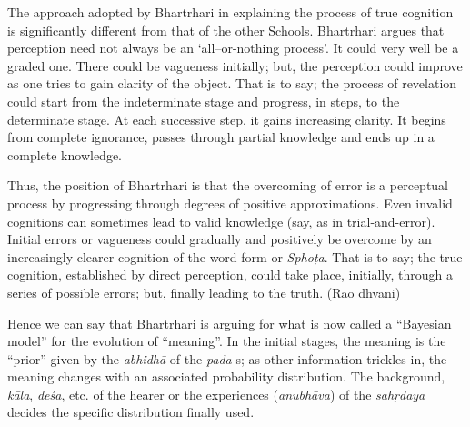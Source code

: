 \begin{myquote}
The approach adopted by Bhartrhari in explaining the process of true cognition is significantly different from that of the other Schools. Bhartrhari argues that perception need not always be an ‘all–or-nothing process’. It could very well be a graded one. There could be vagueness initially; but, the perception could improve as one tries to gain clarity of the object. That is to say; the process of revelation could start from the indeterminate stage and progress, in steps, to the determinate stage. At each successive step, it gains increasing clarity. It begins from complete ignorance, passes through partial knowledge and ends up in a complete knowledge.

Thus, the position of Bhartrhari is that the overcoming of error is a perceptual process by progressing through degrees of positive approximations. Even invalid cognitions can sometimes lead to valid knowledge (say, as in trial-and-error). Initial errors or vagueness could gradually and positively be overcome by an increasingly clearer cognition of the word form or \textsl{Sphoṭa}. That is to say; the true cognition, established by direct perception, could take place, initially, through a series of possible errors; but, finally leading to the truth. (Rao dhvani)
\end{myquote}

Hence we can say that Bhartrhari is arguing for what is now called a “Bayesian model” for the evolution of “meaning”. In the initial stages, the meaning is the “prior” given by the \textsl{abhidhā} of the \textsl{pada}-s; as other information trickles in, the meaning changes with an associated probability distribution. The background, \textsl{kāla}, \textsl{deśa}, etc. of the hearer or the experiences (\textsl{anubhāva}) of the \textsl{sahṛdaya} decides the specific distribution finally used. 

